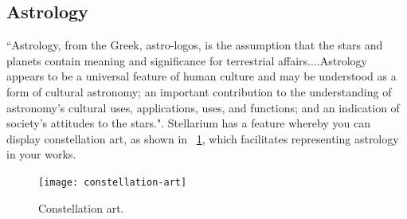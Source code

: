 \subsection{Astrology}
``Astrology, from the Greek, astro-logos, is the assumption that the stars and planets
contain meaning and significance for terrestrial affairs....Astrology appears to
be a universal feature of human culture and may be understood as a form of cultural
astronomy; an important contribution to the understanding of astronomy’s cultural
uses, applications, uses, and functions; and an indication of society’s attitudes to the
stars."\cite[p.~104]{Campion2015}. Stellarium has a feature whereby you can display constellation art, as shown in ~\ref{fig_constellation-art}, which facilitates representing astrology in your works. 

\begin{figure}[ht]
	\centerline{\texttt{[image: constellation-art]}}
	\caption{\label{fig_constellation-art}{Constellation art.}}
\end{figure}


	
